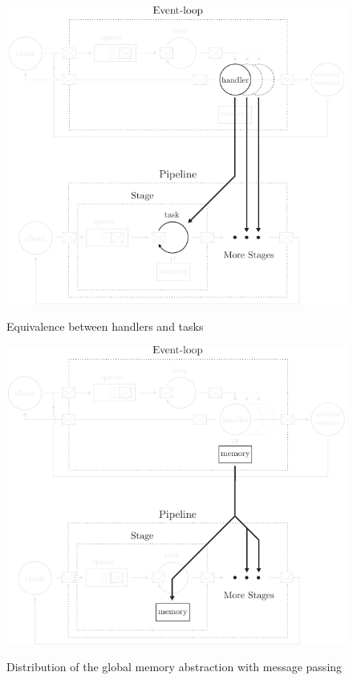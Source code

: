 \begin{figure}[h!]
  \centering
  \begin{minipage}{0.49\textwidth}
    \centering
    \includegraphics[width=\linewidth]{../resources/run-equivalence.pdf}
    \label{fig:run-equivalence}
    \caption{Equivalence between handlers and tasks}
  \end{minipage}
  \vrule
  \hfill
  \begin{minipage}{0.49\textwidth}
    \centering
    \includegraphics[width=\linewidth]{../resources/mem-equivalence.pdf}
    \label{fig:mem-equivalence}
    \caption{Distribution of the global memory abstraction with message passing}
  \end{minipage}
\end{figure}

